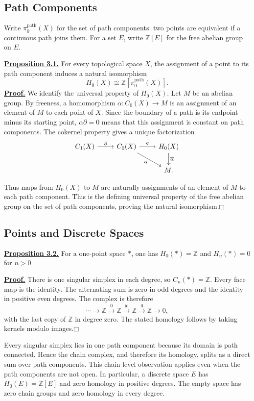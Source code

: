 \documentclass[11pt]{article}
\newcommand{\facehead}[1]{\par\Needspace{4\baselineskip}\subsection{#1}}
\begin{document}
\facehead{Path Components}
Write $\pi_0^{\mathrm{path}}(X)$ for the set of path components: two points are equivalent if a continuous path joins them. For a set $E$, write $\mathbb Z[E]$ for the free abelian group on $E$.

\hypertarget{prop21}{}\textbf{\hyperlink{proof21}{Proposition 3.1.}} For every topological space $X$, the assignment of a point to its path component induces a natural isomorphism
\[H_0(X)\cong\mathbb Z[\pi_0^{\mathrm{path}}(X)].\]
\hypertarget{proof21}{}\textbf{\hyperlink{prop21}{Proof.}} We identify the universal property of $H_0(X)$. Let $M$ be an abelian group. By freeness, a homomorphism $\alpha:C_0(X)\to M$ is an assignment of an element of $M$ to each point of $X$. Since the boundary of a path is its endpoint minus its starting point, $\alpha\partial=0$ means that this assignment is constant on path components. The cokernel property gives a unique factorization
\[
\begin{tikzcd}
C_1(X)\arrow[r,"\partial"]&C_0(X)\arrow[r,"q"]\arrow[dr,"\alpha"']&H_0(X)\arrow[d,"\overline\alpha"]\\
&&M.
\end{tikzcd}
\]

Thus maps from $H_0(X)$ to $M$ are naturally assignments of an element of $M$ to each path component. This is the defining universal property of the free abelian group on the set of path components, proving the natural isomorphism.\hfill$\mdlgwhtsquare$

\facehead{Points and Discrete Spaces}
\hypertarget{prop22}{}\textbf{\hyperlink{proof22}{Proposition 3.2.}} For a one-point space $*$, one has $H_0(*)=\mathbb Z$ and $H_n(*)=0$ for $n>0$.

\hypertarget{proof22}{}\textbf{\hyperlink{prop22}{Proof.}} There is one singular simplex in each degree, so $C_n(*)=\mathbb Z$. Every face map is the identity. The alternating sum is zero in odd degrees and the identity in positive even degrees. The complex is therefore
\[\cdots\longrightarrow\mathbb Z\xrightarrow{0}\mathbb Z\xrightarrow{\mathrm{id}}\mathbb Z\xrightarrow{0}\mathbb Z\longrightarrow0,\]
with the last copy of $\mathbb Z$ in degree zero. The stated homology follows by taking kernels modulo images.\hfill$\mdlgwhtsquare$

Every singular simplex lies in one path component because its domain is path connected. Hence the chain complex, and therefore its homology, splits as a direct sum over path components. This chain-level observation applies even when the path components are not open. In particular, a discrete space $E$ has $H_0(E)=\mathbb Z[E]$ and zero homology in positive degrees. The empty space has zero chain groups and zero homology in every degree.
\end{document}
